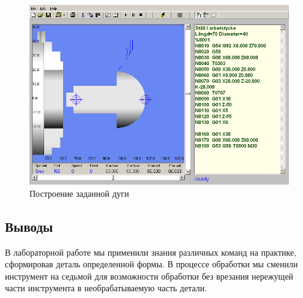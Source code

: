 \begin{figure}[ht]
\centering
	\includegraphics[height=.7\linewidth,angle=90]{1.png}
    \caption{Построение заданной дуги\label{fig:done}}
\end{figure}

\subsection*{Выводы}

В лабораторной работе мы применили знания различных команд на практике, сформировав деталь определенной формы. В процессе обработки мы сменили инструмент на седьмой для возможности обработки без врезания нережущей части инструмента в необрабатываемую часть детали.

\clearpage
